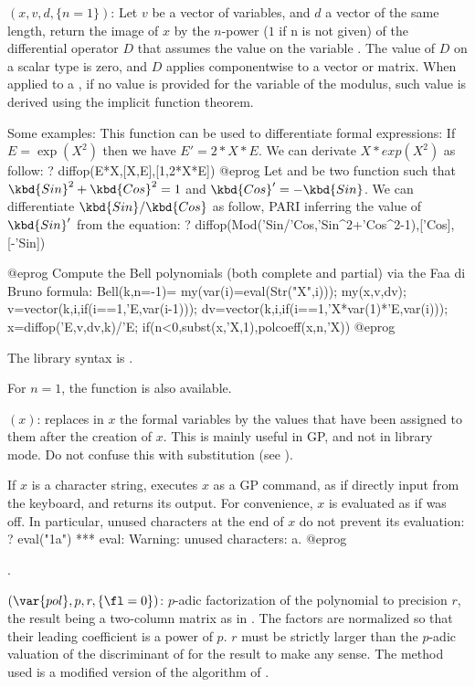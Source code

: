 $(x,v,d,\{n=1\})$: \label{se:diffop}
Let $v$ be a vector of variables, and $d$ a vector of the same length,
return the image of $x$ by the $n$-power ($1$ if n is not given) of the differential
operator $D$ that assumes the value  on the variable .
The value of $D$ on a scalar type is zero, and $D$ applies componentwise to a vector
or matrix. When applied to a , if no value is provided for the variable
of the modulus, such value is derived using the implicit function theorem.

Some examples:
This function can be used to differentiate formal expressions:
If $E=\exp(X^2)$ then we have $E'=2*X*E$. We can derivate $X*exp(X^2)$ as follow:
\bprog
? diffop(E*X,[X,E],[1,2*X*E])
@eprog
Let  and  be two function such that $\kbd{Sin}^2+\kbd{Cos}^2=1$
and $\kbd{Cos}'=-\kbd{Sin}$. We can differentiate $\kbd{Sin}/\kbd{Cos}$ as follow,
PARI inferring the value of $\kbd{Sin}'$ from the equation:
\bprog
? diffop(Mod('Sin/'Cos,'Sin^2+'Cos^2-1),['Cos],[-'Sin])

@eprog
Compute the Bell polynomials (both complete and partial) via the Faa di Bruno formula:
\bprog
Bell(k,n=-1)=
{
  my(var(i)=eval(Str("X",i)));
  my(x,v,dv);
  v=vector(k,i,if(i==1,'E,var(i-1)));
  dv=vector(k,i,if(i==1,'X*var(1)*'E,var(i)));
  x=diffop('E,v,dv,k)/'E;
  if(n<0,subst(x,'X,1),polcoeff(x,n,'X))
}
@eprog

The library syntax is .

For $n=1$, the function  is also available.

$(x)$: \label{se:eval}replaces in $x$ the formal variables by the values that
have been assigned to them after the creation of $x$. This is mainly useful
in GP, and not in library mode. Do not confuse this with substitution (see
).

If $x$ is a character string,  executes $x$ as a GP
command, as if directly input from the keyboard, and returns its
output. For convenience, $x$ is evaluated as if
 was off. In particular, unused characters at the end of
$x$ do not prevent its evaluation:
\bprog
? eval("1a")
  *** eval: Warning: unused characters: a.
@eprog

.

$(\var{pol},p,r,\{\fl=0\})$: \label{se:factorpadic}$p$-adic factorization
of the polynomial  to precision $r$, the result being a
two-column matrix as in . The factors are normalized so that
their leading coefficient is a power of $p$. $r$ must be strictly larger than
the $p$-adic valuation of the discriminant of  for the result to
make any sense. The method used is a modified version of the 
algorithm of .

